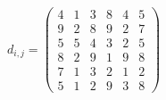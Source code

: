 \documentclass[12pt]{article}
\begin{document}
$ \begin{equation*}    d_{i,j} =     \begin{pmatrix}    4 & 1 & 3 & 8 & 4 & 5 \\    9 & 2 & 8 & 9 & 2 & 7 \\    5 & 5 & 4 & 3 & 2 & 5 \\    8 & 2 & 9 & 1 & 9 & 8 \\ 7 & 1 & 3 & 2 & 1 & 2 \\ 5 & 1 & 2 & 9 & 3 & 8    \end{pmatrix}    \end{equation*} $
\end{document}
